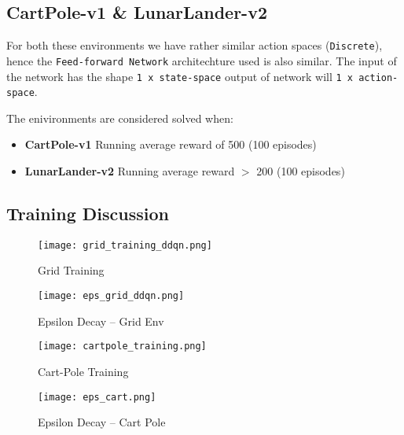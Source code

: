 \documentclass{article} %
\begin{document}
\subsection{CartPole-v1 \& LunarLander-v2}
For both these environments we have rather similar action spaces (\verb|Discrete|), hence the
\verb|Feed-forward Network| architechture used is also similar. The input of the network has the shape
\verb|1 x state-space| output of network will \verb|1 x action-space|.

The enivironments are considered solved when:
\begin{itemize}
    \item[] \textbf{CartPole-v1} Running average reward of 500 (100 episodes)
    \item[] \textbf{LunarLander-v2} Running average reward $>$ 200 (100 episodes)
\end{itemize}


\subsection{Training Discussion}

\begin{figure}[H]
    \begin{center}
        \texttt{[image: grid\_training\_ddqn.png]}
    \end{center}
    \caption{Grid Training}
\end{figure}

\begin{figure}[H]
    \begin{center}
        \texttt{[image: eps\_grid\_ddqn.png]}
    \end{center}
    \caption{Epsilon Decay -- Grid Env}
\end{figure}

\begin{figure}[H]
    \begin{center}
        \texttt{[image: cartpole\_training.png]}
    \end{center}
    \caption{Cart-Pole Training}
\end{figure}

\begin{figure}[H]
    \begin{center}
        \texttt{[image: eps\_cart.png]}
    \end{center}
    \caption{Epsilon Decay -- Cart Pole}
\end{figure}
\end{document}
